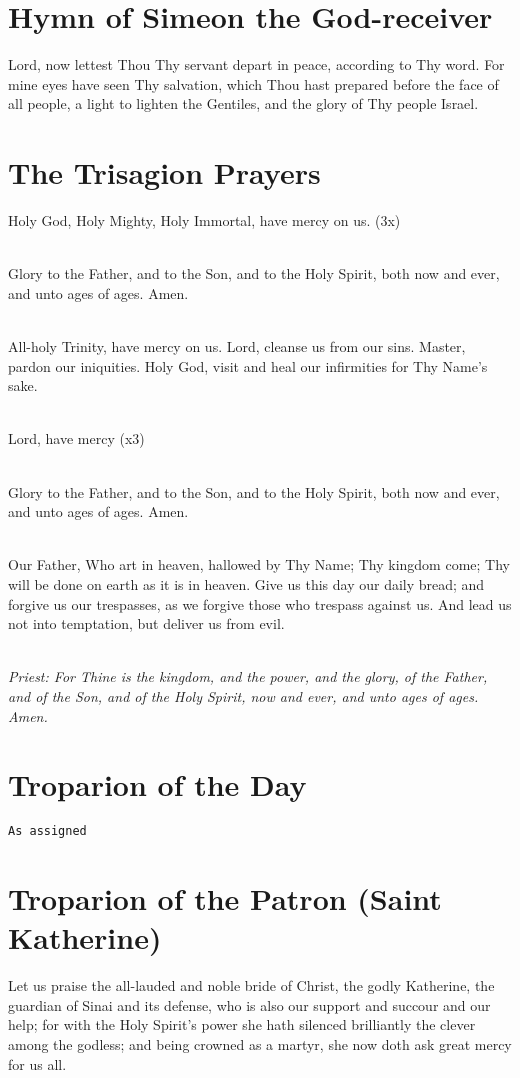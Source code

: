 \section*{Hymn of Simeon the God-receiver}
Lord, now lettest Thou Thy servant depart in peace, 
according to Thy word.
For mine eyes have seen Thy salvation,
which Thou hast prepared before the face of all people,
a light to lighten the Gentiles,
and the glory of Thy people Israel.

\section*{The Trisagion Prayers}
Holy God, Holy Mighty, Holy Immortal, have mercy on us. (3x)

\mbox{}\\
Glory to the Father, and to the Son, and to the Holy Spirit, both now and ever, and unto ages of ages. Amen.

\mbox{}\\
All-holy Trinity, have mercy on us.
Lord, cleanse us from our sins.
Master, pardon our iniquities.
Holy God, visit and heal our infirmities for Thy Name's sake.

\mbox{}\\
Lord, have mercy (x3)

\mbox{}\\
Glory to the Father, and to the Son, and to the Holy Spirit, both now and ever, and unto ages of ages. Amen.

\mbox{}\\
Our Father, Who art in heaven, hallowed by Thy Name;
Thy kingdom come; Thy will be done on earth as it is in heaven.
Give us this day our daily bread;
and forgive us our trespasses, as we forgive those who 
trespass against us.  And lead us not into temptation,
but deliver us from evil.

\mbox{}\\
\emph{Priest: For Thine is the kingdom, and the power, and the glory,
of the Father, and of the Son, and of the Holy Spirit, now and ever,
and unto ages of ages. Amen.}

\section*{Troparion of the Day}
\texttt{As assigned}

\section*{Troparion of the Patron (Saint Katherine)}
Let us praise the all-lauded and noble bride of Christ,
the godly Katherine,
the guardian of Sinai and its defense,
who is also our support and succour and our help;
for with the Holy Spirit's power
she hath silenced brilliantly the clever among the godless;
and being crowned as a martyr, she now doth ask great mercy for us all.

